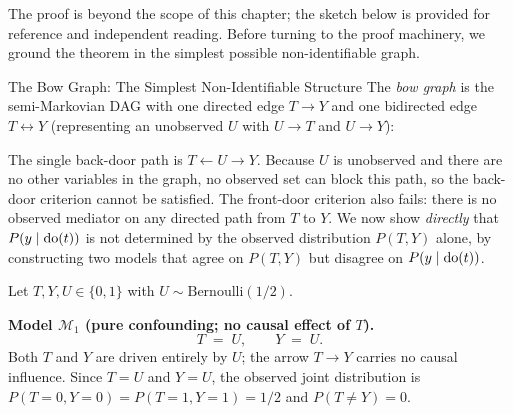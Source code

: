 \documentclass[master.tex]{subfiles}
\begin{document}
The proof is beyond the scope of this chapter; the sketch below is
provided for reference and independent reading.  Before turning to the
proof machinery, we ground the theorem in the simplest possible
non-identifiable graph.

\begin{example}{The Bow Graph: The Simplest Non-Identifiable Structure}
\label{w3:ex:bowgraph}
The \emph{bow graph} is the semi-Markovian DAG with one directed edge
$T \to Y$ and one bidirected edge $T \leftrightarrow Y$ (representing an
unobserved $U$ with $U \to T$ and $U \to Y$):

\begin{center}
\end{center}

\noindent
The single back-door path is $T \leftarrow U \to Y$.  Because $U$ is
unobserved and there are no other variables in the graph, no observed set
can block this path, so the back-door criterion cannot be satisfied.  The
front-door criterion also fails: there is no observed mediator on any
directed path from $T$ to $Y$.  We now show \emph{directly} that
$P(y \mid \mathrm{do}(t))$ is not determined by the observed distribution
$P(T, Y)$ alone, by constructing two models that agree on $P(T, Y)$ but
disagree on $P(y \mid \mathrm{do}(t))$.

Let $T, Y, U \in \{0, 1\}$ with $U \sim \mathrm{Bernoulli}(1/2)$.

\medskip
\noindent\textbf{Model $\mathcal{M}_1$ (pure confounding; no causal effect of $T$).}
\[
  T \;=\; U, \qquad Y \;=\; U.
\]
Both $T$ and $Y$ are driven entirely by $U$; the arrow $T \to Y$ carries
no causal influence.  Since $T = U$ and $Y = U$, the observed joint
distribution is $P(T{=}0, Y{=}0) = P(T{=}1, Y{=}1) = 1/2$ and
$P(T \neq Y) = 0$.


\end{example}
\end{document}

